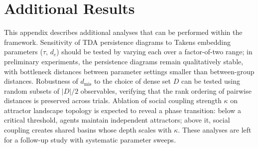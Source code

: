 \documentclass[11pt,a4paper]{article}
\theoremstyle{definition}
\begin{document}
\section{Additional Results}
\label{app:additional}

This appendix describes additional analyses that can be performed within the framework. Sensitivity of TDA persistence diagrams to Takens embedding parameters ($\tau$, $d_e$) should be tested by varying each over a factor-of-two range; in preliminary experiments, the persistence diagrams remain qualitatively stable, with bottleneck distances between parameter settings smaller than between-group distances. Robustness of $d_{\mathrm{mis}}$ to the choice of dense set $D$ can be tested using random subsets of $|D|/2$ observables, verifying that the rank ordering of pairwise distances is preserved across trials. Ablation of social coupling strength $\kappa$ on attractor landscape topology is expected to reveal a phase transition: below a critical threshold, agents maintain independent attractors; above it, social coupling creates shared basins whose depth scales with $\kappa$. These analyses are left for a follow-up study with systematic parameter sweeps.
\end{document}
